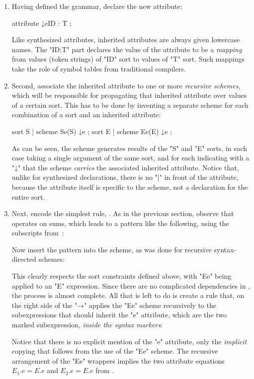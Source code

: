 \documentclass[11pt]{article} %
\begin{document}
\begin{example}
\begin{enumerate}
\item Having defined the grammar, declare the new attribute:
  \begin{hacs}
   attribute ↓e{ID : T} ;
  \end{hacs}
  Like synthesized attributes, inherited attributes are always given lowercase names.  The "{ID:T}"
  part declares the value of the attribute to be a \emph{mapping} from values (token strings) of
  "ID" sort to values of "T" sort. Such mappings take the role of symbol tables from traditional
  compilers.

\item Second, associate the inherited attribute to one or more \emph{recursive schemes}, which will
  be responsible for propagating that inherited attribute over values of a certain sort.  This has
  to be done by inventing a separate scheme for each combination of a sort and an inherited
  attribute:
  \begin{hacs}
   sort S | scheme Se(S) ↓e ;
   sort E | scheme Ee(E) ↓e ;
  \end{hacs}
  As can be seen, the scheme generates results of the "S" and "E" sorts, in each case taking a
  single argument of the same sort, and for each indicating with a "↓" that the scheme
  \emph{carries} the associated inherited attribute. Notice that, unlike for synthesized
  declarations, there is no "|" in front of the attribute, because the attribute itself is specific
  to the scheme, not a declaration for the entire sort.

\item Next, encode the simplest rule, . As in the previous section, observe that
   operates on sums, which leads to a pattern like the following, using the subscripts
  from~:
  Now insert the pattern into the scheme, as was done for recursive syntax-directed schemes:
  This clearly respects the sort constraints defined above, with "Ee" being applied to an "E"
  expression. Since there are no complicated dependencies in , the process is almost
  complete. All that is left to do is create a rule that, on the right side of the "→" applies the
  "Ee" scheme recursively to the subexpressions that should inherit the "e" attribute, which are the
  two marked subexpression, \emph{inside the syntax markers}:
  Notice that there is no explicit mention of the "e" attribute, only the \emph{implicit} copying
  that follows from the use of the "Ee" scheme. The recursive arrangement of the "Ee" wrappers
  implies the two attribute equations $E_1.e=E.e$ and $E_2.e=E.e$ from .


\end{enumerate}
\end{example}
\end{document}
